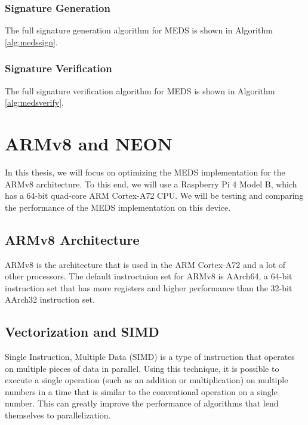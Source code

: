 \documentclass[11pt,a4paper]{report}
\theoremstyle{definition}
\begin{document}
\subsubsection{Signature Generation}
The full signature generation algorithm for MEDS is shown in Algorithm \ref{alg:medssign}.

\subsubsection{Signature Verification}
The full signature verification algorithm for MEDS is shown in Algorithm \ref{alg:medsverify}.

\section{ARMv8 and NEON}
\label{sec:armv8}

In this thesis, we will focus on optimizing the MEDS implementation for the ARMv8 architecture. To this end, we will use a Raspberry Pi 4 Model B, which has a 64-bit quad-core ARM Cortex-A72 CPU. We will be testing and comparing the performance of the MEDS implementation on this device.

\subsection{ARMv8 Architecture}
ARMv8 is the architecture that is used in the ARM Cortex-A72 and a lot of other processors. The default instroctuion set for ARMv8 is AArch64, a 64-bit instruction set that has more registers and higher performance than the 32-bit AArch32 instruction set.

\subsection{Vectorization and SIMD}
Single Instruction, Multiple Data (SIMD) is a type of instruction that operates on multiple pieces of data in parallel. Using this technique, it is possible to execute a single operation (such as an addition or multiplication) on multiple numbers in a time that is similar to the conventional operation on a single number. This can greatly improve the performance of algorithms that lend themselves to parallelization.
\end{document}
